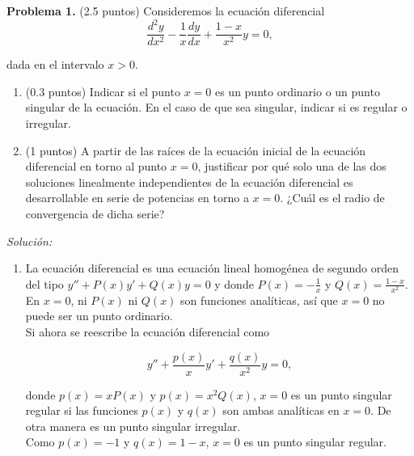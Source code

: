 \textbf{Problema 1.} (2.5 puntos) Consideremos la ecuación diferencial
\begin{equation*}
    \frac{d^2 y}{dx^2} - \frac{1}{x}\frac{dy}{dx} + \frac{1-x}{x^2}{y} = 0,
\end{equation*}

dada en el intervalo $x > 0$.

\begin{enumerate}
[label=(\alph*)]
    \item (0.3 puntos) Indicar si el punto $x = 0$ es un punto ordinario o un punto singular de la
    ecuación. En el caso de que sea singular, indicar si es regular o irregular.
    \item (1 puntos) A partir de las raíces de la ecuación inicial de la ecuación diferencial en torno
    al punto $x = 0$, justificar por qué solo una de las dos soluciones linealmente independientes
    de la ecuación diferencial es desarrollable en serie de potencias en torno a $x = 0$. ¿Cuál es
    el radio de convergencia de dicha serie?
\end{enumerate}


\vspace{20px}
\textit{Solución:}
\\

\begin{enumerate}
[label=(\alph*)]
    \item La ecuación diferencial
    es una ecuación lineal homogénea de segundo orden del tipo $y'' + P(x) y' + Q(x) y = 0$ y donde $P(x) = -\frac{1}{x}$
    y $Q(x) = \frac{1-x}{x^2}$. En $x = 0$, ni $P(x)$ ni $Q(x)$ son funciones analíticas, así que $x=0$ no
    puede ser un punto ordinario.\\

    Si ahora se reescribe la ecuación diferencial como

    \begin{equation*}
        y'' + \frac{p(x)}{x} y' + \frac{q(x)}{x^2} y = 0,
    \end{equation*}

    donde $p(x) = x P(x)$ y $p(x) = x^2 Q(x)$, $x = 0$ es un punto singular regular si las funciones $p(x)$ y $q(x)$
    son ambas analíticas en $x = 0$. De otra manera es un punto singular irregular.\\

    Como $p(x) = -1$ y $q(x) = 1 - x$, $x = 0$ es un punto singular regular.

\end{enumerate}
